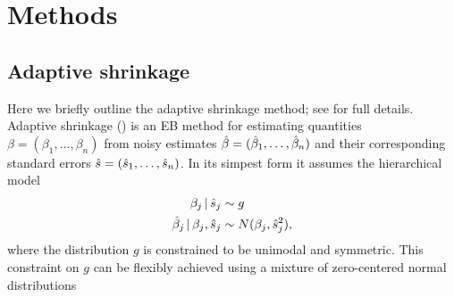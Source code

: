 \documentclass[12pt]{article}
\newcommand{\Gb}{\beta}
\newcommand{\s}{\sigma}
\begin{document}

\section{Methods}

\def\bY{\bm{Y}}
\def\bmu{\bm{\mu}}
\def\bp{\bm{p}}
\def\be{\bm{\epsilon}}
\def\tbY{\tilde\bY}
\def\tbe{\tilde\be}
\def\tbmu{\tilde\bmu}
\def\tmu{\tilde\mu}
\def\tY{\tilde{Y}}
\def\s{\sigma}
\def\|{\,|\,}

\subsection{Adaptive shrinkage}

Here we briefly outline the adaptive shrinkage method; see \cite{stephens:2015} for full details.
Adaptive shrinkage (\ash) is an EB method
for estimating quantities $\beta=(\beta_1,\dots,\beta_n)$ from noisy estimates 
$\hat{\beta}=(\hat{\beta}_1,\dots,\hat{\beta}_n)$ and their corresponding standard errors $\hat{s} = (\hat{s}_1,\dots,\hat{s}_n)$. 
In its simpest form it assumes the hierarchical model
\begin{align}
\beta_j \| \shat_j & \sim g \\
\bhat_j \| \beta_j, \shat_j & \sim N(\beta_j, \shat_j^2),
\end{align}
where the distribution $g$ is constrained to be unimodal and symmetric. This constraint on $g$ can
be flexibly achieved using 
a mixture of zero-centered normal distributions
\end{document}
